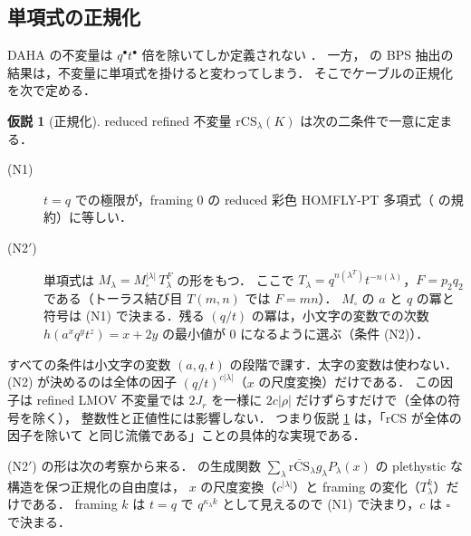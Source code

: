 \documentclass[11pt,a4paper]{ltjsarticle}
\theoremstyle{definition}
\newtheorem{hypothesis}[proposition]{仮説}
\theoremstyle{remark}
\newcommand{\rCS}{\overline{\mathrm{rCS}}}
\begin{document}
\subsection{単項式の正規化}\label{sec:normalization}

DAHA の不変量は $q^\bullet t^\bullet$ 倍を除いてしか定義されない \cite{CD14}．
一方，\cite{KN} の BPS 抽出の結果は，不変量に単項式を掛けると変わってしまう．
そこでケーブルの正規化を次で定める．

\begin{hypothesis}[正規化]\label{hyp:norm}
reduced refined 不変量 $\mathrm{rCS}_\lambda(K)$ は次の二条件で一意に定まる．
\begin{description}
\item[(N1)] $t=q$ での極限が，framing 0 の reduced 彩色 HOMFLY-PT 多項式（\cite{DGR} の規約）に等しい．
\item[(N2$'$)] 単項式は $M_\lambda=M_\square^{|\lambda|}\,T_\lambda^{F}$ の形をもつ．
  ここで $T_\lambda=q^{n(\lambda^T)}t^{-n(\lambda)}$，$F=p_2q_2$ である（トーラス結び目 $T(m,n)$ では $F=mn$）．
  $M_\square$ の $a$ と $q$ の冪と符号は (N1) で決まる．残る $(q/t)$ の冪は，小文字の変数での次数
  $h(a^xq^yt^z)=x+2y$ の最小値が $0$ になるように選ぶ（条件 (N2)）．
\end{description}
\end{hypothesis}

すべての条件は小文字の変数 $(a,q,t)$ の段階で課す．太字の変数は使わない．
(N2) が決めるのは全体の因子 $(q/t)^{c|\lambda|}$（$x$ の尺度変換）だけである．
この因子は refined LMOV 不変量では $2J_r$ を一様に $2c|\rho|$ だけずらすだけで（全体の符号を除く），
整数性と正値性には影響しない．
つまり仮説 \ref{hyp:norm} は，「rCS が全体の因子を除いて \cite{KN} と同じ流儀である」ことの具体的な実現である．

(N2$'$) の形は次の考察から来る．
\cite{KN} の生成関数 $\sum_\lambda\rCS_\lambda g_\lambda P_\lambda(x)$ の plethystic な構造を保つ正規化の自由度は，
$x$ の尺度変換（$c^{|\lambda|}$）と framing の変化（$T_\lambda^k$）だけである．
framing $k$ は $t=q$ で $q^{\kappa_\lambda k}$ として見えるので (N1) で決まり，$c$ は $\square$ で決まる．
\end{document}
